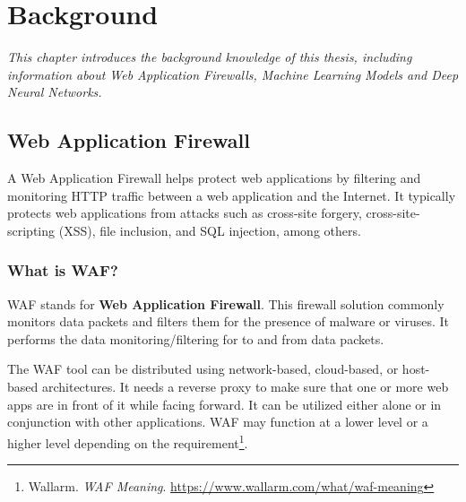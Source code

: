 
\chapter{Background}
\label{chap:background}
\textit{\hspace{0.5cm}This chapter introduces the background knowledge of this thesis, including information about Web Application Firewalls, Machine Learning Models and Deep Neural Networks.}
\minitoc

\section{Web Application Firewall} 
\label{sec:waf}
\hspace{0.5cm}A Web Application Firewall helps protect web applications by filtering and monitoring HTTP traffic between a web application and the Internet. It typically protects web applications from attacks such as cross-site forgery, cross-site-scripting (XSS), file inclusion, and SQL injection, among others. 
\subsection{What is WAF?}
\label{subsec:waf_def}
\hspace{0.5cm}WAF stands for \textbf{Web Application Firewall}. This firewall solution commonly monitors data packets and filters them for the presence of malware or viruses. It performs the data monitoring/filtering for to and from data packets.  

The WAF tool can be distributed using network-based, cloud-based, or host-based architectures. It needs a reverse proxy to make sure that one or more web apps are in front of it while facing forward. It can be utilized either alone or in conjunction with other applications. WAF may function at a lower level or a higher level depending on the requirement\footnote{\label{wallarm} Wallarm. \textit{WAF Meaning}. \url{https://www.wallarm.com/what/waf-meaning}}.


